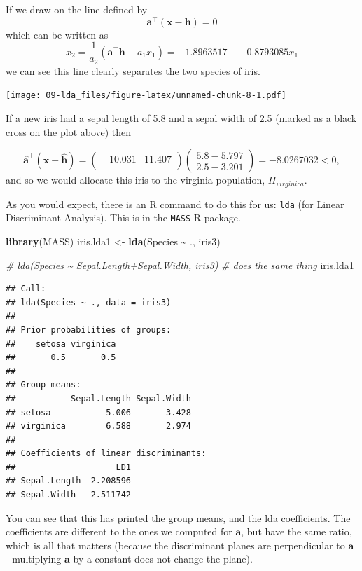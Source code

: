\documentclass[
]{book}
\newenvironment{Shaded}{\begin{snugshade}}{\end{snugshade}}
\newcommand{\CommentTok}[1]{\textcolor[rgb]{0.56,0.35,0.01}{\textit{#1}}}
\newcommand{\FunctionTok}[1]{\textcolor[rgb]{0.13,0.29,0.53}{\textbf{#1}}}
\newcommand{\NormalTok}[1]{#1}
\newcommand{\OtherTok}[1]{\textcolor[rgb]{0.56,0.35,0.01}{#1}}
\newcommand{\SpecialCharTok}[1]{\textcolor[rgb]{0.81,0.36,0.00}{\textbf{#1}}}
\theoremstyle{definition}
\theoremstyle{definition}
\theoremstyle{definition}
\theoremstyle{definition}
\theoremstyle{remark}
\begin{document}
If we draw on the line defined by
\[\mathbf a^\top (\mathbf x-\mathbf h)=0\]
which can be written as
\[x_2 = \frac{1}{a_2}(\mathbf a^\top\mathbf h-a_1x_1) = -1.8963517 - -0.8793085 x_1\]
we can see this line clearly separates the two species of iris.

\texttt{[image: 09-lda\_files/figure-latex/unnamed-chunk-8-1.pdf]}

If a new iris had a sepal length of 5.8 and a sepal width of 2.5 (marked as a black cross on the plot above) then

\[ \hat{\mathbf a}^\top (\mathbf x- \hat{\mathbf h}) = \begin{pmatrix}-10.031&11.407 \\\end{pmatrix} \begin{pmatrix} 5.8 - 5.797 \\ 2.5 - 3.201 \end{pmatrix} =-8.0267032 < 0,\]
and so we would allocate this iris to the virginia population, \(\Pi_{virginica}\).

As you would expect, there is an R command to do this for us: \texttt{lda} (for Linear Discriminant Analysis). This is in the \texttt{MASS} R package.

\begin{Shaded}
\begin{Highlighting}[]
\FunctionTok{library}\NormalTok{(MASS)}
\NormalTok{iris.lda1 }\OtherTok{\textless{}{-}} \FunctionTok{lda}\NormalTok{(Species }\SpecialCharTok{\textasciitilde{}}\NormalTok{ ., iris3)}

\CommentTok{\# lda(Species \textasciitilde{} Sepal.Length+Sepal.Width, iris3) }
  \CommentTok{\#  does the same thing}
\NormalTok{iris.lda1}
\end{Highlighting}
\end{Shaded}

\begin{verbatim}
## Call:
## lda(Species ~ ., data = iris3)
## 
## Prior probabilities of groups:
##    setosa virginica 
##       0.5       0.5 
## 
## Group means:
##           Sepal.Length Sepal.Width
## setosa           5.006       3.428
## virginica        6.588       2.974
## 
## Coefficients of linear discriminants:
##                    LD1
## Sepal.Length  2.208596
## Sepal.Width  -2.511742
\end{verbatim}

You can see that this has printed the group means, and the lda coefficients. The coefficients are different to the ones we computed for \(\mathbf a\), but have the same ratio, which is all that matters (because the discriminant planes are perpendicular to \(\mathbf a\) - multiplying \(\mathbf a\) by a constant does not change the plane).
\end{document}
